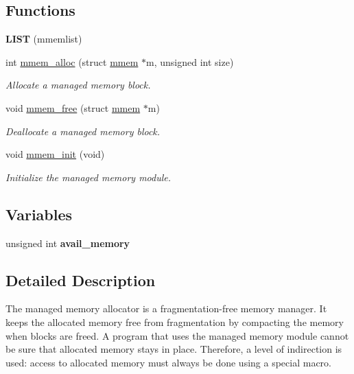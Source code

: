 \subsection*{Functions}
\begin{DoxyCompactItemize}
\item 
\hypertarget{group__mmem_ga0cefcd211c74c9e1e5e87faf6616cc48}{}{\bfseries L\+I\+S\+T} (mmemlist)\label{group__mmem_ga0cefcd211c74c9e1e5e87faf6616cc48}

\item 
int \hyperlink{group__mmem_ga0fedd76f44b4750a7762f633467e5515}{mmem\+\_\+alloc} (struct \hyperlink{structmmem}{mmem} $\ast$m, unsigned int size)
\begin{DoxyCompactList}\small\item\em Allocate a managed memory block. \end{DoxyCompactList}\item 
void \hyperlink{group__mmem_ga172798945ec6cf2d23cb7cb7dc76861c}{mmem\+\_\+free} (struct \hyperlink{structmmem}{mmem} $\ast$m)
\begin{DoxyCompactList}\small\item\em Deallocate a managed memory block. \end{DoxyCompactList}\item 
void \hyperlink{group__mmem_ga71d6c141eaf75846c90c72f6f1386902}{mmem\+\_\+init} (void)
\begin{DoxyCompactList}\small\item\em Initialize the managed memory module. \end{DoxyCompactList}\end{DoxyCompactItemize}
\subsection*{Variables}
\begin{DoxyCompactItemize}
\item 
\hypertarget{group__mmem_gade5eff319d4fab5a0ceefb8742c1dc7a}{}unsigned int {\bfseries avail\+\_\+memory}\label{group__mmem_gade5eff319d4fab5a0ceefb8742c1dc7a}

\end{DoxyCompactItemize}


\subsection{Detailed Description}
The managed memory allocator is a fragmentation-\/free memory manager. It keeps the allocated memory free from fragmentation by compacting the memory when blocks are freed. A program that uses the managed memory module cannot be sure that allocated memory stays in place. Therefore, a level of indirection is used\+: access to allocated memory must always be done using a special macro.


